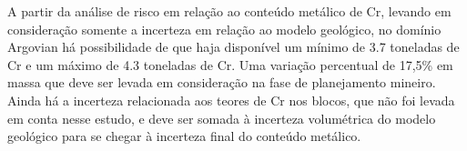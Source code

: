 A partir da análise de risco em relação ao conteúdo metálico de Cr, levando em consideração somente a incerteza em relação ao modelo geológico, no domínio Argovian há possibilidade de que haja disponível um mínimo de 3.7 toneladas de Cr e um máximo de 4.3 toneladas de Cr. Uma variação percentual de 17,5\% em massa que deve ser levada em consideração na fase de planejamento mineiro. Ainda há a incerteza relacionada aos teores de Cr nos blocos, que não foi levada em conta nesse estudo, e deve ser somada à incerteza volumétrica do modelo geológico para se chegar à incerteza final do conteúdo metálico.
